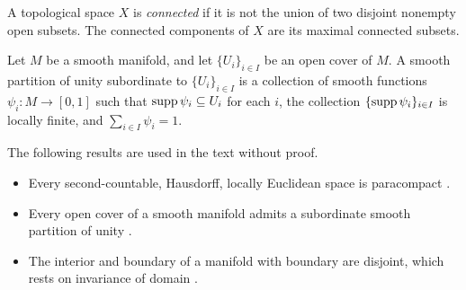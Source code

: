 \documentclass[a4paper,12pt]{article}
\begin{document}
\begin{appendices}
\begin{definition}[Connected]\label{def:connected}
    A topological space $X$ is \emph{connected} if it is not the union of two disjoint nonempty open subsets.
    The connected components of $X$ are its maximal connected subsets.
\end{definition}
\begin{definition}\label{def:partition_of_unity}
    Let $M$ be a smooth manifold, and let $\{U_i\}_{i \in I}$ be an open cover of $M$.
    A smooth partition of unity subordinate to $\{U_i\}_{i \in I}$ is a collection of smooth functions $\psi_i \colon M \to [0, 1]$ such that $\operatorname{supp} \psi_i \subseteq U_i$ for each $i$, the collection $\{\operatorname{supp} \psi_i\}_{i \in I}$ is locally finite, and $\sum_{i \in I} \psi_i = 1$.
\end{definition}
The following results are used in the text without proof.
\begin{itemize}
    \item Every second-countable, Hausdorff, locally Euclidean space is paracompact \cite[Thm.~1.15]{Lee2012}.
    \item Every open cover of a smooth manifold admits a subordinate smooth partition of unity \cite[Thm.~2.23]{Lee2012}.
    \item The interior and boundary of a manifold with boundary are disjoint, which rests on invariance of domain \cite[Thm.~1.37]{Lee2012}.
\end{itemize}

\end{appendices}
\end{document}
